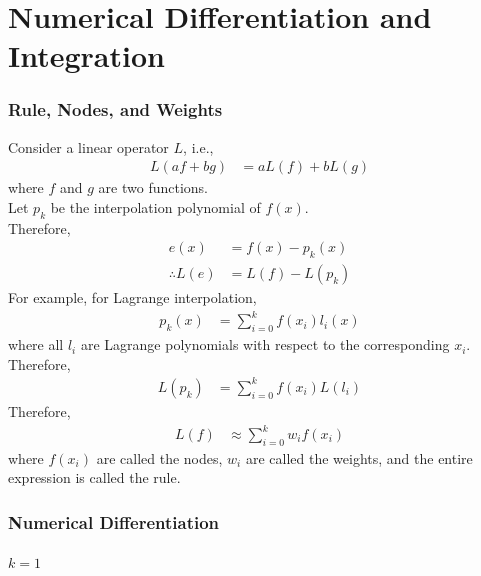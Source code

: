 \documentclass[fleqn, a4paper, 12pt, twoside, titlepage]{article}
\theoremstyle{definition}
\theoremstyle{theorem}
\begin{document}
\newpage
\part{Numerical Differentiation and Integration}

\section{Rule, Nodes, and Weights}

Consider a linear operator $L$, i.e.,
\begin{align*}
	L(a f + b g) &= a L(f) + b L(g)
\end{align*}
where $f$ and $g$ are two functions.\\
Let $p_k$ be the interpolation polynomial of $f(x)$.\\
Therefore,
\begin{align*}
	e(x) &= f(x) - p_k(x)\\
	\therefore L(e) &= L(f) - L(p_k)
\end{align*}
For example, for Lagrange interpolation,
\begin{align*}
	p_k(x) &= \sum\limits_{i = 0}^{k} f(x_i) l_i(x)
\end{align*}
where all $l_i$ are Lagrange polynomials with respect to the corresponding $x_i$.\\
Therefore,
\begin{align*}
	L(p_k) &= \sum\limits_{i = 0}^{k} f(x_i) L(l_i)
\end{align*}
Therefore,
\begin{align*}
	L(f) &\approx \sum\limits_{i = 0}^{k} w_i f(x_i)
\end{align*}
where $f(x_i)$ are called the nodes, $w_i$ are called the weights, and the entire expression is called the rule.

\section{Numerical Differentiation}

\subsection{$k = 1$}
\end{document}
